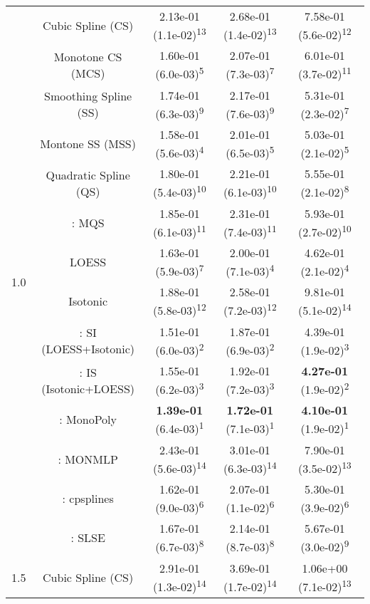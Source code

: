 \begin{tabular}{ccccc}
\midrule
\multirow{14}{*}{1.0}&Cubic Spline (CS)& 2.13e-01 (1.1e-02)\textsuperscript{13}& 2.68e-01 (1.4e-02)\textsuperscript{13}& 7.58e-01 (5.6e-02)\textsuperscript{12}\tabularnewline
&Monotone CS (MCS)& 1.60e-01 (6.0e-03)\textsuperscript{5}& 2.07e-01 (7.3e-03)\textsuperscript{7}& 6.01e-01 (3.7e-02)\textsuperscript{11}\tabularnewline
&Smoothing Spline (SS)& 1.74e-01 (6.3e-03)\textsuperscript{9}& 2.17e-01 (7.6e-03)\textsuperscript{9}& 5.31e-01 (2.3e-02)\textsuperscript{7}\tabularnewline
&Montone SS (MSS)& 1.58e-01 (5.6e-03)\textsuperscript{4}& 2.01e-01 (6.5e-03)\textsuperscript{5}& 5.03e-01 (2.1e-02)\textsuperscript{5}\tabularnewline
&Quadratic Spline (QS)& 1.80e-01 (5.4e-03)\textsuperscript{10}& 2.21e-01 (6.1e-03)\textsuperscript{10}& 5.55e-01 (2.1e-02)\textsuperscript{8}\tabularnewline
&\textcite{heMonotoneBsplineSmoothing1998}: MQS& 1.85e-01 (6.1e-03)\textsuperscript{11}& 2.31e-01 (7.4e-03)\textsuperscript{11}& 5.93e-01 (2.7e-02)\textsuperscript{10}\tabularnewline
&LOESS& 1.63e-01 (5.9e-03)\textsuperscript{7}& 2.00e-01 (7.1e-03)\textsuperscript{4}& 4.62e-01 (2.1e-02)\textsuperscript{4}\tabularnewline
&Isotonic& 1.88e-01 (5.8e-03)\textsuperscript{12}& 2.58e-01 (7.2e-03)\textsuperscript{12}& 9.81e-01 (5.1e-02)\textsuperscript{14}\tabularnewline
&\textcite{mammenEstimatingSmoothMonotone1991}: SI (LOESS+Isotonic)& 1.51e-01 (6.0e-03)\textsuperscript{2}& 1.87e-01 (6.9e-03)\textsuperscript{2}& 4.39e-01 (1.9e-02)\textsuperscript{3}\tabularnewline
&\textcite{mammenEstimatingSmoothMonotone1991}: IS (Isotonic+LOESS)& 1.55e-01 (6.2e-03)\textsuperscript{3}& 1.92e-01 (7.2e-03)\textsuperscript{3}& \textbf{4.27e-01} (1.9e-02)\textsuperscript{2}\tabularnewline
&\textcite{murrayFastFlexibleMethods2016a}: MonoPoly& \textbf{1.39e-01} (6.4e-03)\textsuperscript{1}& \textbf{1.72e-01} (7.1e-03)\textsuperscript{1}& \textbf{4.10e-01} (1.9e-02)\textsuperscript{1}\tabularnewline
&\textcite{cannonMonmlpMultilayerPerceptron2017}: MONMLP& 2.43e-01 (5.6e-03)\textsuperscript{14}& 3.01e-01 (6.3e-03)\textsuperscript{14}& 7.90e-01 (3.5e-02)\textsuperscript{13}\tabularnewline
&\textcite{navarro-garciaConstrainedSmoothingOutofrange2023}: cpsplines& 1.62e-01 (9.0e-03)\textsuperscript{6}& 2.07e-01 (1.1e-02)\textsuperscript{6}& 5.30e-01 (3.9e-02)\textsuperscript{6}\tabularnewline
&\textcite{groeneboomConfidenceIntervalsMonotone2023}: SLSE& 1.67e-01 (6.7e-03)\textsuperscript{8}& 2.14e-01 (8.7e-03)\textsuperscript{8}& 5.67e-01 (3.0e-02)\textsuperscript{9}\tabularnewline
\midrule
\multirow{14}{*}{1.5}&Cubic Spline (CS)& 2.91e-01 (1.3e-02)\textsuperscript{14}& 3.69e-01 (1.7e-02)\textsuperscript{14}& 1.06e+00 (7.1e-02)\textsuperscript{13}\tabularnewline

\end{tabular}
